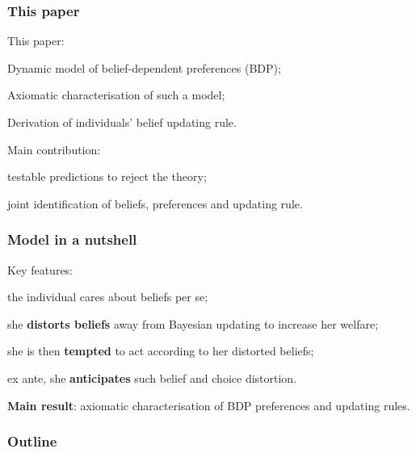 \documentclass[usenames,dvipsnames,aspectratio=169,11pt, handout]{beamer}
\begin{document}
\begin{frame}\frametitle{This paper}
	This paper:

	\vfill

	\begin{wideenumerate}
		\item Dynamic model of belief-dependent preferences (BDP);
		\item Axiomatic characterisation of such a model;
		\item Derivation of individuals' belief updating rule.
	\end{wideenumerate} \pause

	\vfill

	Main contribution:
	\vfill
	\begin{wideitemize}
		\item testable predictions to reject the theory;
		\item joint identification of beliefs, preferences and updating rule.
	\end{wideitemize}

\end{frame}

\begin{frame}\frametitle{Model in a nutshell}

	Key features:

	\vfill

	\begin{wideitemize}
		\item the individual cares about beliefs per se;
		\item she \textbf{distorts beliefs} away from Bayesian updating to increase her welfare;
		\item she is then \textbf{tempted} to act according to her distorted beliefs;
		\item ex ante, she \textbf{anticipates} such belief and choice distortion. \footnotesize{\citep{cobb-clarkPredictivePowerSelfcontrol2022}}
	\end{wideitemize}

	\vfill \pause

	\textbf{Main result}: axiomatic characterisation of BDP preferences and updating rules.

\end{frame}

\begin{frame}\frametitle{Outline}

	\tableofcontents

\end{frame}
\end{document}

